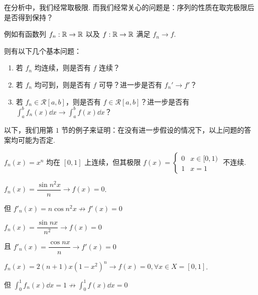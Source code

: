 
在分析中，我们经常取极限. 而我们经常关心的问题是：序列的性质在取完极限后是否得到保持？

例如有函数列 $f_n:\mathbb{R}\to\mathbb{R}$ 以及 $f:\mathbb{R}\to\mathbb{R}$ 满足 $f_n\to f$.

则有以下几个基本问题：

\begin{enumerate}
    \item 若 $f_n$ 均连续，则是否有 $f$ 连续？
    
    \item 若 $f_n$ 均可到，则是否有 $f$ 可导？进一步是否有 $f_n'\to f'$？
    
    \item 若 $f_n\in\mathcal{R}[a,b]$，则是否有 $f\in\mathcal{R}[a,b]$？进一步是否有 $\displaystyle\int_a^bf_n(x)\dd x\to\int_a^bf(x)\dd x$？
\end{enumerate}

以下，我们用第 $1$ 节的例子来证明：在没有进一步假设的情况下，以上问题的答案均可能为否定.

\begin{example}
    $f_n(x)=x^n$ 均在 $[0,1]$ 上连续，但其极限 $f(x)=\begin{cases}
        0 & x\in[0,1)\\
        1 & x=1
    \end{cases}$ 不连续.
\end{example}

\begin{example}
    $f_n(x)=\dfrac{\sin n^2x}{n}\to f(x)=0$.

    \vspace{0.2em}

    但 $f'_n(x)=n\cos n^2x\not\to f'(x)=0$
\end{example}

\begin{example}
    $f_n(x)=\dfrac{\sin nx}{n^2}\to f(x)=0$

    \vspace{0.2em}

    且 $f'_n(x)=\dfrac{\cos nx}{n}\to f'(x)=0$
\end{example}

\begin{example}
    $f_n(x)=2(n+1)x(1-x^2)^n\to f(x)=0,\forall x\in X=[0,1]$.

    \vspace{0.2em}

    但 $\displaystyle\int_0^1f_n(x)\dd x=1\not\to\int_0^1f(x)\dd x=0$
\end{example}

